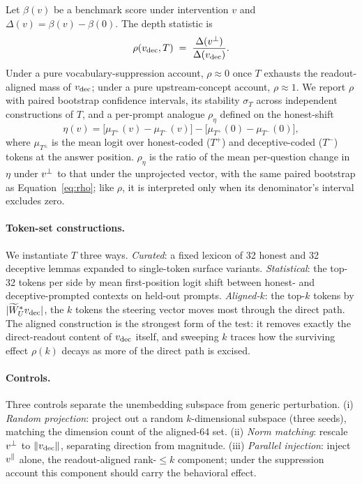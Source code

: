 Let $\beta(v)$ be a benchmark score under intervention $v$ and $\Delta(v) = \beta(v) - \beta(0)$. The depth statistic is
\begin{equation}
\rho(v_{\mathrm{dec}}, T) \;=\; \frac{\Delta(v^{\perp})}{\Delta(v_{\mathrm{dec}})} .
\label{eq:rho}
\end{equation}
Under a pure vocabulary-suppression account, $\rho \approx 0$ once $T$ exhausts the readout-aligned mass of $v_{\mathrm{dec}}$; under a pure upstream-concept account, $\rho \approx 1$. We report $\rho$ with paired bootstrap confidence intervals, its stability $\sigma_T$ across independent constructions of $T$, and a per-prompt analogue $\rho_\eta$ defined on the honest-shift
\begin{equation}
\eta(v) = \big[\mu_{T^{+}}(v) - \mu_{T^{-}}(v)\big] - \big[\mu_{T^{+}}(0) - \mu_{T^{-}}(0)\big],
\label{eq:eta}
\end{equation}
where $\mu_{T^{\pm}}$ is the mean logit over honest-coded ($T^{+}$) and deceptive-coded ($T^{-}$) tokens at the answer position. $\rho_\eta$ is the ratio of the mean per-question change in $\eta$ under $v^{\perp}$ to that under the unprojected vector, with the same paired bootstrap as Equation~\ref{eq:rho}; like $\rho$, it is interpreted only when its denominator's interval excludes zero.

\paragraph{Token-set constructions.}
We instantiate $T$ three ways. \emph{Curated}: a fixed lexicon of 32 honest and 32 deceptive lemmas expanded to single-token surface variants. \emph{Statistical}: the top-32 tokens per side by mean first-position logit shift between honest- and deceptive-prompted contexts on held-out prompts. \emph{Aligned-$k$}: the top-$k$ tokens by $|\widetilde{W}_{U}^{*}v_{\mathrm{dec}}|$, the $k$ tokens the steering vector moves most through the direct path. The aligned construction is the strongest form of the test: it removes exactly the direct-readout content of $v_{\mathrm{dec}}$ itself, and sweeping $k$ traces how the surviving effect $\rho(k)$ decays as more of the direct path is excised.

\paragraph{Controls.}
Three controls separate the unembedding subspace from generic perturbation. (i) \emph{Random projection}: project out a random $k$-dimensional subspace (three seeds), matching the dimension count of the aligned-64 set. (ii) \emph{Norm matching}: rescale $v^{\perp}$ to $\|v_{\mathrm{dec}}\|$, separating direction from magnitude. (iii) \emph{Parallel injection}: inject $v^{\parallel}$ alone, the readout-aligned rank-$\le k$ component; under the suppression account this component should carry the behavioral effect.
